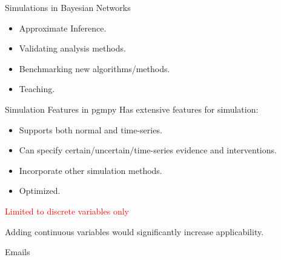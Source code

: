 \documentclass{beamer}
\begin{document}
\begin{frame}{Simulations in Bayesian Networks}
	\begin{itemize}
		\item Approximate Inference.
		\item Validating analysis methods.
		\item Benchmarking new algorithms/methods.
		\item Teaching.
	\end{itemize}
\end{frame}

\begin{frame}{Simulation Features in pgmpy}
	Has extensive features for simulation:
	\begin{itemize}
		\item Supports both normal and time-series.
		\item Can specify certain/uncertain/time-series evidence and interventions.
		\item Incorporate other simulation methods.
		\item Optimized.
	\end{itemize}


	\vspace{4em}
	\centerline{\textcolor{red}{Limited to discrete variables only}}
	\centerline{Adding continuous variables would significantly increase applicability.}



\end{frame}

\begin{frame}{Emails}
\end{frame}
\end{document}
